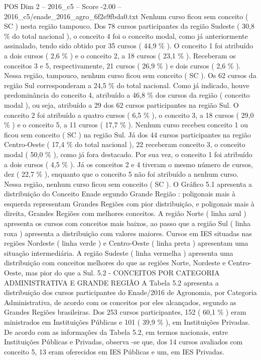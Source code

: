 \begin{textsample}{POS Dim 2 – 2016\_c5 – Score -2.00 – 2016\_c5/enade\_2016\_agro\_6f2e9fbda0.txt}
Nenhum curso ficou sem conceito ( SC ) nesta região tampouco.
Dos 78 cursos participantes da região Sudeste ( 30,8 \% do total nacional ), o conceito 4 foi o conceito modal, como já anteriormente assinalado, tendo sido obtido por 35 cursos ( 44,9 \% ).
O conceito 1 foi atribuído a dois cursos ( 2,6 \% ) e o conceito 2, a 18 cursos ( 23,1 \% ).
Receberam os conceitos 3 e 5, respectivamente, 21 cursos ( 26,9 \% ) e dois cursos ( 2,6 \% ).
Nessa região, tampouco, nenhum curso ficou sem conceito ( SC ).
Os 62 cursos da região Sul corresponderam a 24,5 \% do total nacional.
Como já indicado, houve predominância do conceito 4, atribuído a 46,8 \% dos cursos da região ( conceito modal ), ou seja, atribuído a 29 dos 62 cursos participantes na região Sul.
O conceito 2 foi atribuído a quatro cursos ( 6,5 \% ), o conceito 3, a 18 cursos ( 29,0 \% ) e o conceito 5, a 11 cursos ( 17,7 \% ).
Nenhum curso recebeu conceito 1 ou ficou sem conceito ( SC ) na região Sul.
Já dos 44 cursos participantes na região Centro-Oeste ( 17,4 \% do total nacional ), 22 receberam conceito 3, o conceito modal ( 50,0 \% ), como já fora destacado.
Por sua vez, o conceito 1 foi atribuído a dois cursos ( 4,5 \% ).
Já os conceitos 2 e 4 tiveram o mesmo número de cursos, dez ( 22,7 \% ), enquanto que o conceito 5 não foi atribuído a nenhum curso.
Nessa região, nenhum curso ficou sem conceito ( SC ).
O Gráfico 5.1 apresenta a distribuição do Conceito Enade segundo Grande Região : poligonais mais à esquerda representam Grandes Regiões com pior distribuição, e poligonais mais à direita, Grandes Regiões com melhores conceitos.
A região Norte ( linha azul ) apresenta os cursos com conceitos mais baixos, ao passo que a região Sul ( linha roxa ) apresenta a distribuição com valores maiores.
Cursos em IES situadas nas regiões Nordeste ( linha verde ) e Centro-Oeste ( linha preta ) apresentam uma situação intermediária.
A região Sudeste ( linha vermelha ) apresenta uma distribuição com conceitos melhores do que as regiões Norte, Nordeste e Centro-Oeste, mas pior do que a Sul. 5.2 - CONCEITOS POR CATEGORIA ADMINISTRATIVA E GRANDE REGIÃO A Tabela 5.2 apresenta a distribuição dos cursos participantes do Enade/2016 de Agronomia, por Categoria Administrativa, de acordo com os conceitos por eles alcançados, segundo as Grandes Regiões brasileiras.
Dos 253 cursos participantes, 152 ( 60,1 \% ) eram ministrados em Instituições Públicas e 101 ( 39,9 \% ), em Instituições Privadas.
De acordo com as informações da Tabela 5.2, em termos nacionais, entre Instituições Públicas e Privadas, observa -se que, dos 14 cursos avaliados com conceito 5, 13 eram oferecidos em IES Públicas e um, em IES Privadas.

\end{textsample}
